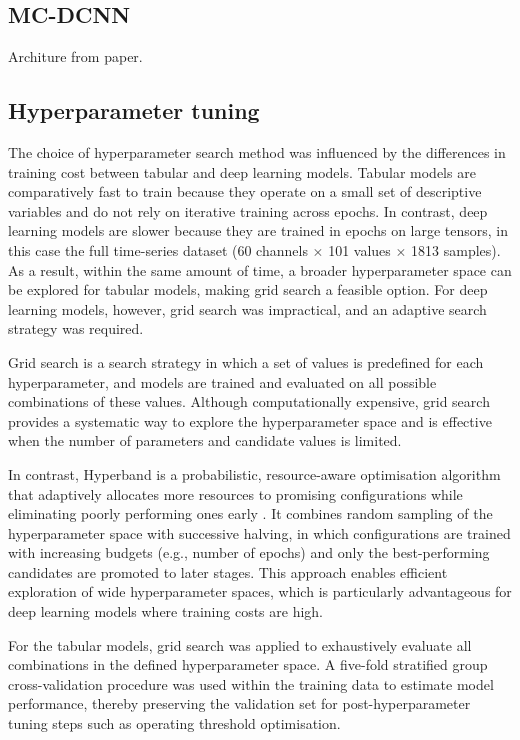 \subsection{MC-DCNN}\label{subsec:method-mc-dcnn}
Architure from paper.

\subsection{Hyperparameter tuning}\label{subsec:method-hyperparam-tuning}
The choice of hyperparameter search method was influenced by the differences in training cost between tabular and deep learning models. Tabular models are comparatively fast to train because they operate on a small set of descriptive variables and do not rely on iterative training across epochs. In contrast, deep learning models are slower because they are trained in epochs on large tensors, in this case the full time-series dataset (60 channels $\times$ 101 values $\times$ 1813 samples). As a result, within the same amount of time, a broader hyperparameter space can be explored for tabular models, making grid search a feasible option. For deep learning models, however, grid search was impractical, and an adaptive search strategy was required.

Grid search is a search strategy in which a set of values is predefined for each hyperparameter, and models are trained and evaluated on all possible combinations of these values. Although computationally expensive, grid search provides a systematic way to explore the hyperparameter space and is effective when the number of parameters and candidate values is limited.

In contrast, Hyperband is a probabilistic, resource-aware optimisation algorithm that adaptively allocates more resources to promising configurations while eliminating poorly performing ones early \citep{Li2018Hyperband}. It combines random sampling of the hyperparameter space with successive halving, in which configurations are trained with increasing budgets (e.g., number of epochs) and only the best-performing candidates are promoted to later stages. This approach enables efficient exploration of wide hyperparameter spaces, which is particularly advantageous for deep learning models where training costs are high.

For the tabular models, grid search was applied to exhaustively evaluate all combinations in the defined hyperparameter space. A five-fold stratified group cross-validation procedure was used within the training data to estimate model performance, thereby preserving the validation set for post-hyperparameter tuning steps such as operating threshold optimisation.

